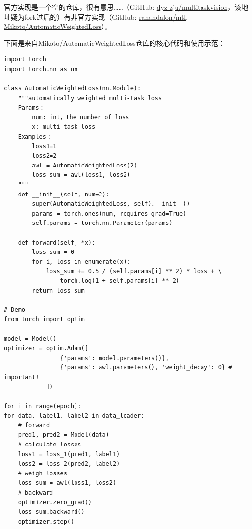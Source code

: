 \documentclass{ctexart}
\begin{document}
\subsubsection{}

官方实现是一个空的仓库，很有意思……（GitHub: \href{https://github.com/dyz-zju/multitaskvision}{dyz-zju/multitaskvision}，该地址疑为fork过后的）有非官方实现（GitHub: \href{https://github.com/ranandalon/mtl}{ranandalon/mtl}, \href{https://github.com/Mikoto10032/AutomaticWeightedLoss}{Mikoto/Automatic\-Weighted\-Loss}）。

下面是来自Mikoto/Automatic\-Weighted\-Loss仓库的核心代码和使用示范：
\begin{verbatim}
import torch
import torch.nn as nn

class AutomaticWeightedLoss(nn.Module):
    """automatically weighted multi-task loss
    Params：
        num: int，the number of loss
        x: multi-task loss
    Examples：
        loss1=1
        loss2=2
        awl = AutomaticWeightedLoss(2)
        loss_sum = awl(loss1, loss2)
    """
    def __init__(self, num=2):
        super(AutomaticWeightedLoss, self).__init__()
        params = torch.ones(num, requires_grad=True)
        self.params = torch.nn.Parameter(params)

    def forward(self, *x):
        loss_sum = 0
        for i, loss in enumerate(x):
            loss_sum += 0.5 / (self.params[i] ** 2) * loss + \
                torch.log(1 + self.params[i] ** 2)
        return loss_sum

# Demo
from torch import optim

model = Model()
optimizer = optim.Adam([
                {'params': model.parameters()},
                {'params': awl.parameters(), 'weight_decay': 0} # important!
            ])

for i in range(epoch):
for data, label1, label2 in data_loader:
    # forward
    pred1, pred2 = Model(data)
    # calculate losses
    loss1 = loss_1(pred1, label1)
    loss2 = loss_2(pred2, label2)
    # weigh losses
    loss_sum = awl(loss1, loss2)
    # backward
    optimizer.zero_grad()
    loss_sum.backward()
    optimizer.step()
\end{verbatim}

\subsubsection{}
\end{document}
